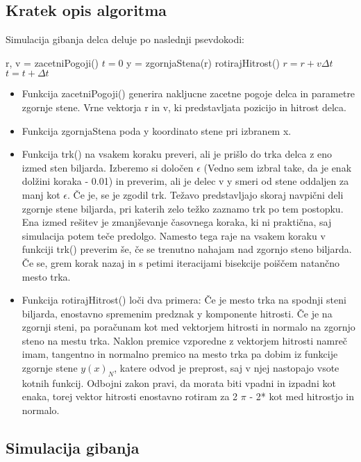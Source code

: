 \documentclass{article}
\begin{document}
\subsection{Kratek opis algoritma}
Simulacija gibanja delca deluje po naslednji psevdokodi:
\begin{algorithmic}
\STATE r, v = zacetniPogoji()
\STATE  $t= 0$
\STATE y = zgornjaStena(r)
\STATE rotirajHitrost()
\ENDIF
\STATE $r = r +  v\Delta t$
\STATE $t = t + \Delta t$
\ENDWHILE
\end{algorithmic}

\begin{itemize}
\item Funkcija zacetniPogoji() generira nakljucne zacetne pogoje delca in parametre zgornje stene. Vrne vektorja r in v, ki predstavljata pozicijo in hitrost delca.

\item Funkcija zgornjaStena poda y koordinato stene pri izbranem x.

\item Funkcija trk() na vsakem koraku preveri, ali je prišlo do trka delca z eno izmed sten biljarda. Izberemo si določen $\epsilon$ (Vedno sem izbral take, da je enak dolžini koraka - 0.01) in preverim, ali je delec v y smeri od stene oddaljen za manj kot $\epsilon$. Če je, se je zgodil trk. Težavo predstavljajo skoraj navpični deli zgornje stene biljarda, pri katerih zelo težko zaznamo trk po tem postopku. Ena izmed rešitev je zmanjševanje časovnega koraka, ki ni praktična, saj simulacija potem teče predolgo. Namesto tega raje na vsakem koraku v funkciji trk() preverim še, če se trenutno nahajam nad zgornjo steno biljarda. Če se, grem korak nazaj in s petimi iteracijami bisekcije poiščem natančno mesto trka.

\item Funkcija rotirajHitrost() loči dva primera: Če je mesto trka na spodnji steni biljarda, enostavno spremenim predznak y komponente hitrosti. Če je na zgornji steni, pa poračunam kot med vektorjem hitrosti in normalo na zgornjo steno na mestu trka. Naklon premice vzporedne z vektorjem hitrosti namreč imam, tangentno in normalno premico na mesto trka pa dobim iz funkcije zgornje stene $y(x)_N$, katere odvod je preprost, saj v njej nastopajo vsote kotnih funkcij. Odbojni zakon pravi, da morata biti vpadni in izpadni kot enaka, torej vektor hitrosti enostavno rotiram za 2 $\pi$ - 2* kot med hitrostjo in normalo. 
\end{itemize}
\subsection{Simulacija gibanja}
\end{document}
